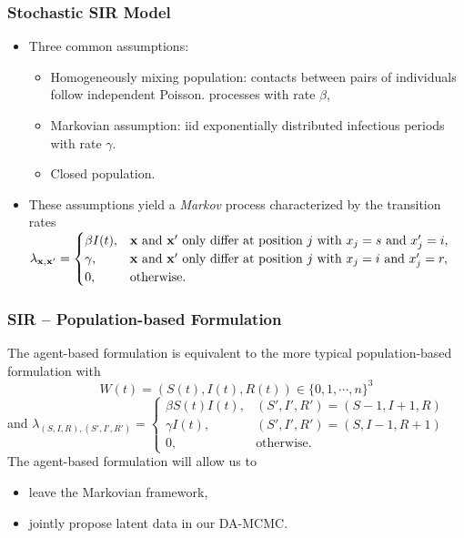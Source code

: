 \documentclass{beamer}
\begin{document}
\begin{frame} \frametitle{Stochastic SIR Model}  
	
	\begin{itemize}
		\item Three common assumptions:
		\begin{itemize}
			\item Homogeneously mixing population: contacts between pairs of individuals follow independent Poisson. processes with rate $\beta$,
			\item Markovian assumption: iid exponentially distributed infectious periods with rate $\gamma$.
			\item Closed population.
		\end{itemize}
	\vfill
		\item These assumptions yield a \textit{Markov} process characterized by the transition rates			
			$
			\lambda_{\mathbf{x}, \mathbf{x}'} = 
			\begin{cases}
				\beta I(t), & \mathbf{x} \text{ and } \mathbf{x}' \text{ only differ at position } j \text{ with } x_j = s \text{ and } x_j' = i, \\
				\gamma, & \mathbf{x} \text{ and } \mathbf{x}' \text{ only differ at position } j \text{ with } x_j = i \text{ and } x_j' = r, \\
				0, & \text{otherwise.}
			\end{cases}
			$
	\end{itemize}
\end{frame}



\begin{frame} \frametitle{SIR -- Population-based Formulation} 
	
	The agent-based formulation is equivalent to the more typical population-based formulation with
	$$W(t) = \left( S(t), I(t), R(t)\right)  \in \{0, 1, \cdots, n\}^3$$
	and 	
	$
	\lambda_{(S, I, R), (S', I', R')} = 
	\begin{cases}
		\beta S(t) I(t), & (S', I', R') = (S - 1, I + 1, R)\\
		\gamma I(t)    , & (S', I', R') = (S, I - 1, R + 1)\\
		0, & \text{otherwise.}
	\end{cases}
	$
	\vfill
	The agent-based formulation will allow us to
	\begin{itemize}
		\item leave the Markovian framework,
		\item jointly propose latent data in our DA-MCMC.
	\end{itemize}
	
\end{frame}
\end{document}
